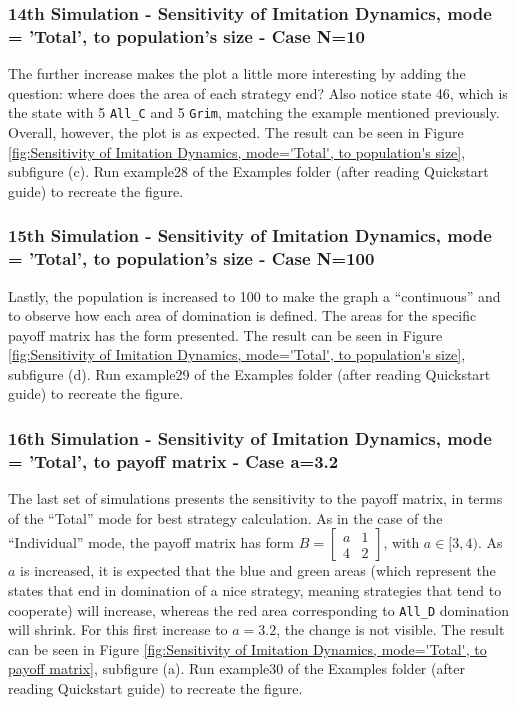 \subsubsection{14th Simulation - Sensitivity of Imitation Dynamics, mode = 'Total', to population's size - Case N=10}
The further increase makes the plot a little more interesting by adding the question: where does the area of each strategy end? Also notice state 46, which is the state with 5 \texttt{All\_C} and 5 \texttt{Grim}, matching the example mentioned previously. Overall, however, the plot is as expected. The result can be seen in Figure \ref{fig:Sensitivity of Imitation Dynamics, mode='Total', to population's size}, subfigure (c). Run example28 of the Examples folder (after reading Quickstart guide) to recreate the figure.

\subsubsection{15th Simulation - Sensitivity of Imitation Dynamics, mode = 'Total', to population's size - Case N=100}
Lastly, the population is increased to 100 to make the graph a ``continuous'' and to observe how each area of domination is defined. The areas for the specific payoff matrix has the form presented. The result can be seen in Figure \ref{fig:Sensitivity of Imitation Dynamics, mode='Total', to population's size}, subfigure (d). Run example29 of the Examples folder (after reading Quickstart guide) to recreate the figure.

\subsubsection{16th Simulation - Sensitivity of Imitation Dynamics, mode = 'Total', to payoff matrix - Case a=3.2}
The last set of simulations presents the sensitivity to the payoff matrix, in terms of the ``Total'' mode for best strategy calculation. As in the case of the ``Individual'' mode, the payoff matrix has form $B = \begin{bmatrix} a & 1 \\ 4 & 2 \end{bmatrix}$, with $a \in [3,4)$. As $a$ is increased, it is expected that the blue and green areas (which represent the states that end in domination of a nice strategy, meaning strategies that tend to cooperate) will increase, whereas the red area corresponding to \texttt{All\_D} domination will shrink. For this first increase to $a=3.2$, the change is not visible. The result can be seen in Figure \ref{fig:Sensitivity of Imitation Dynamics, mode='Total', to payoff matrix}, subfigure (a). Run example30 of the Examples folder (after reading Quickstart guide) to recreate the figure.

